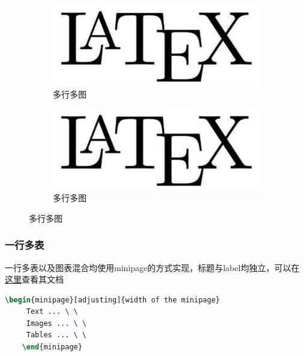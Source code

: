 \begin{figure}[htbp]
    \begin{subfigure}[t]{0.4\linewidth}
        \includegraphics[width=\linewidth]{figure/Latex.jpg}
        \caption{多行多图}
        \label{fig:myfig9}
    \end{subfigure}
    \quad
    \begin{subfigure}[t]{0.4\linewidth}
        \includegraphics[width=\linewidth]{figure/Latex.jpg}
        \caption{多行多图}
        \label{fig:myfig10}
    \end{subfigure}
    \caption{多行多图}
    \label{fig:myfig11}
\end{figure}

\subsubsection{一行多表}
一行多表以及图表混合均使用minipage的方式实现，标题与label均独立，可以在\href{http://www.sascha-frank.com/latex-minipage.html}{这里}查看其文档

\begin{lstlisting}[language={TeX}]
    \begin{minipage}[adjusting]{width of the minipage}
     Text ... \ \
     Images ... \ \
     Tables ... \ \
    \end{minipage} 
\end{lstlisting}

